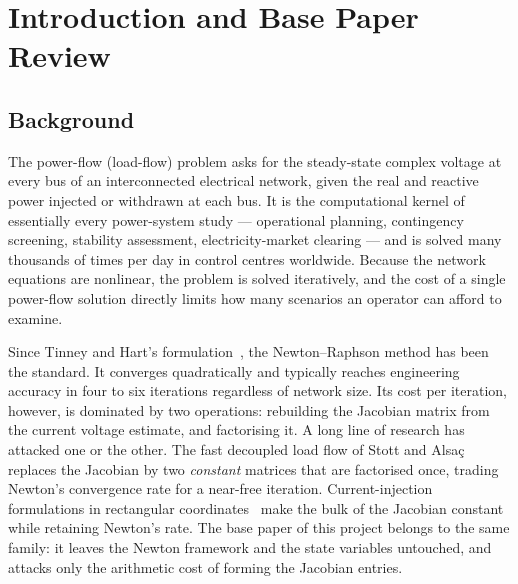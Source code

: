 \documentclass[sigconf,nonacm]{acmart}
\begin{document}

\maketitle

\section{Introduction and Base Paper Review}

\subsection{Background}
The power-flow (load-flow) problem asks for the steady-state complex voltage at
every bus of an interconnected electrical network, given the real and reactive
power injected or withdrawn at each bus. It is the computational kernel of
essentially every power-system study --- operational planning, contingency
screening, stability assessment, electricity-market clearing --- and is solved
many thousands of times per day in control centres worldwide. Because the
network equations are nonlinear, the problem is solved iteratively, and the cost
of a single power-flow solution directly limits how many scenarios an operator
can afford to examine.

Since Tinney and Hart's formulation~\cite{tinney1967}, the Newton--Raphson
method has been the standard. It converges quadratically and typically reaches
engineering accuracy in four to six iterations regardless of network size. Its
cost per iteration, however, is dominated by two operations: rebuilding the
Jacobian matrix from the current voltage estimate, and factorising it. A long
line of research has attacked one or the other. The fast decoupled load flow of
Stott and Alsa\c{c}~\cite{stott1974} replaces the Jacobian by two \emph{constant}
matrices that are factorised once, trading Newton's convergence rate for a
near-free iteration. Current-injection formulations in rectangular
coordinates~\cite{dacosta1999} make the bulk of the Jacobian constant while
retaining Newton's rate. The base paper of this project belongs to the same
family: it leaves the Newton framework and the state variables untouched, and
attacks only the arithmetic cost of forming the Jacobian entries.
\end{document}
